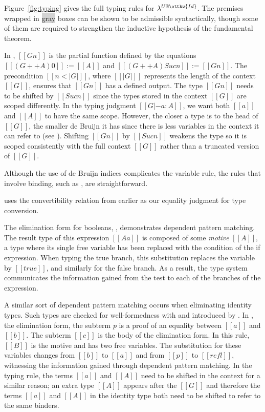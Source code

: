 \documentclass[acmsmall,screen=true,
\ifpublic review=false\else,review=true\fi
  ,anonymous=\ifanonymous true\else false\fi]{acmart}
\newcommand{\lang}{$\lambda^{U\mathbb{B}\ottkw{Id}}$\xspace}
\newcommand{\yl}[1]{}
\begin{document}
Figure~\ref{fig:typing} gives the full typing rules for \lang{}. The premises
wrapped in \colorbox{lightgray}{gray} boxes can be shown to be admissible
syntactically, though some of them are required to strengthen the inductive
hypothesis of the fundamental theorem.

In , $[[G n]]$ is the partial function defined by the equations
$[[ (G ++ A) 0 ]] := [[A]]$ and $[[ (G ++ A) Suc n ]] := [[G n]]$.  The
precondition $[[n < | G | ]]$, where $[[ | G | ]]$ represents the length of
the context $[[G]]$, ensures that $[[G n]]$ has a defined output. The type
$[[G n]]$ needs to be shifted by $[[Suc n]]$ since the types stored in the
context $[[G]]$ are scoped differently. In the typing judgment
$[[G |- a : A]]$, we want both $[[a]]$ and $[[A]]$ to have the same
scope. However, the closer a type is to the head of $[[G]]$, the smaller de
Bruijn it has since there is less variables in the context it can refer to
(see ). Shifting $[[G n]]$ by $[[Suc n]]$ weakens the type so
it is scoped consistently with the full context $[[G]]$ rather than a
truncated version of $[[G]]$.

Although the use of de Bruijn indices complicates the variable rule, the rules
that involve binding, such as , are straightforward.

 uses the convertibility relation from earlier
as our equality judgment for type conversion.

The elimination form for booleans, , demonstrates dependent pattern
matching.  The result type of this expression $[[A {a}]]$ is composed of some
\emph{motive} $[[A]]$, a type where its single free variable has been replaced
with the condition of the if expression. When typing the true branch, this
substitution replaces the variable by $[[true]]$, and similarly for the false
branch. As a result, the type system communicates the information gained from
the %
test to each of the branches of the expression.

A similar sort of dependent pattern matching occurs when eliminating identity
types. Such types are checked for well-formedness with  and
introduced by . In , the elimination form, the subterm
$p$ is a proof of an equality between $[[a]]$ and $[[b]]$. The subterm $[[c]]$
is the body of the elimination form. In this rule, $[[B]]$ is the motive and has two free variables.  The substitution for these
variables changes from $[[b]]$ to $[[a]]$ and from $[[p]]$ to $[[refl]]$,
witnessing the information gained through dependent pattern matching.  In the
typing rule, the terms $[[a]]$ and $[[A]]$ need to be shifted in the context
for a similar reason; an extra type $[[A]]$ appears after the $[[G]]$ and
therefore the terms $[[a]]$ and $[[A]]$ in the identity type both need to be
shifted to refer to the same binders.
\end{document}
